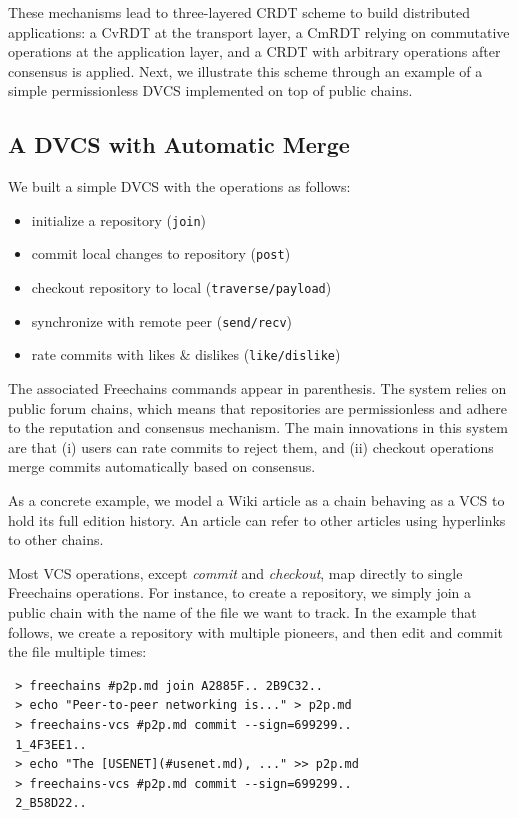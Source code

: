 \documentclass[10pt,journal,compsoc]{IEEEtran}
\newcommand{\FC}       {Freechains\xspace}
\begin{document}
These mechanisms lead to three-layered CRDT scheme to build distributed
applications:
    a CvRDT at the transport layer,
    a CmRDT relying on commutative operations at the application layer, and
    a CRDT with arbitrary operations after consensus is applied.
Next, we illustrate this scheme through an example of a simple permissionless
DVCS implemented on top of public chains.

\subsection{A DVCS with Automatic Merge}

We built a simple DVCS with the operations as follows:
%
\begin{itemize}
    \setlength{\itemindent}{-8pt}
    \item initialize a repository (\texttt{join})
    \item commit local changes to repository (\texttt{post})
    \item checkout repository to local (\texttt{traverse/payload})
    \item synchronize with remote peer (\texttt{send/recv})
    \item rate commits with likes \& dislikes (\texttt{like/dislike})
\end{itemize}
%
The associated \FC commands appear in parenthesis.
%
The system relies on public forum chains, which means that repositories are
permissionless and adhere to the reputation and consensus mechanism.
The main innovations in this system are that
    (i)  users can rate commits to reject them, and
    (ii) checkout operations merge commits automatically based on consensus.

As a concrete example, we model a Wiki article as a chain behaving as a VCS to
hold its full edition history.
An article can refer to other articles using hyperlinks to other chains.

Most VCS operations, except \emph{commit} and \emph{checkout}, map directly to
single \FC operations.
For instance, to create a repository, we simply join a public chain with the
name of the file we want to track.
In the example that follows, we create a repository with multiple pioneers, and
then edit and commit the file multiple times:

{\footnotesize
\begin{verbatim}
 > freechains #p2p.md join A2885F.. 2B9C32..
 > echo "Peer-to-peer networking is..." > p2p.md
 > freechains-vcs #p2p.md commit --sign=699299..
 1_4F3EE1..
 > echo "The [USENET](#usenet.md), ..." >> p2p.md
 > freechains-vcs #p2p.md commit --sign=699299..
 2_B58D22..
\end{verbatim}
}
\end{document}
